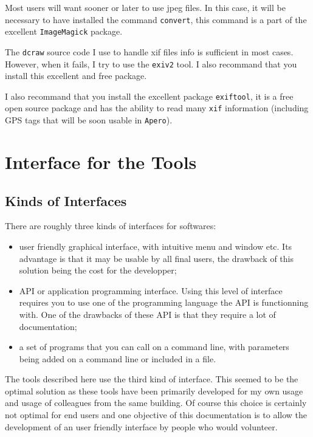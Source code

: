 Most users will want sooner or later to use jpeg files. In this case, it will be necessary
to have installed the command {\tt convert}, this command is a part of the excellent
{\tt ImageMagick} package.


The {\tt dcraw} source code I use to handle xif files info is sufficient in most cases.
However, when it fails, I try to use the {\tt exiv2} tool. I also recommand that
you install this excellent and free package.

I also recommand that you install the excellent package {\tt exiftool}, it is a free
open source package and has the ability to read many {\tt xif} information (including
GPS tags that will be soon usable in {\tt Apero}).




\section{Interface for the Tools}

\subsection{Kinds of Interfaces}
There are roughly three kinds of interfaces for softwares:

\begin{itemize}
   \item user friendly graphical interface, with intuitive menu and window etc.
         Its advantage is that it may be usable by all final users,
         the drawback of this solution being the cost for the developper;

   \item API or application programming interface. Using this level of interface requires you
         to use one of the programming language the API is functionning with. One of
         the drawbacks of these API is that they require a lot of documentation;

   \item a set of programs that you can call on a command line, with parameters being
         added on a command line or included in a file.

\end{itemize}

The tools described here use the third kind of interface. This seemed to be the
optimal solution as these tools have been primarily developed for my own usage and
usage of colleagues from the same building.  Of course this choice is certainly
not optimal for end users and one objective of this documentation is to  allow
the development of an user friendly interface by people who would volunteer.

